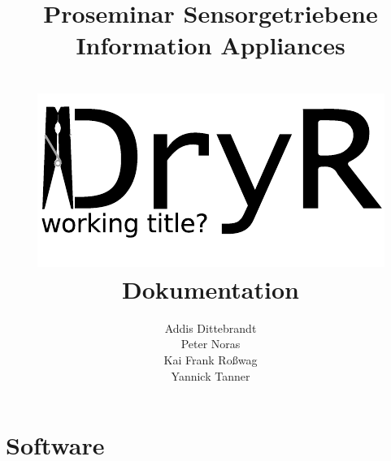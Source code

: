 \documentclass[ngerman,parskip=full]{article}
\title{ \Huge{\textbf{Proseminar Sensorgetriebene Information Appliances}}  
	\\ \textbf{}
	\\ \includegraphics{logo.pdf}
	\\ [20pt] \huge{\textbf{Dokumentation}}}
\author{Addis Dittebrandt \\ Peter Noras \\ Kai Frank Roßwag \\ Yannick Tanner}
\begin{document}
	\begin{titlepage}

		\maketitle
		\thispagestyle{empty}
		\newpage

	\end{titlepage}

	\tableofcontents 
	\newpage

	
	
	
	
	
	\section{Software}
	
	
	
	
	
	
\end{document}
